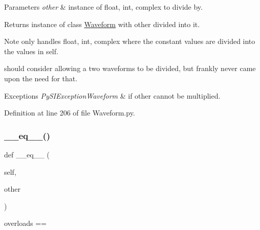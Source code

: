 \begin{DoxyParams}{Parameters}
{\em other} & instance of float, int, complex to divide by. \\
\hline
\end{DoxyParams}
\begin{DoxyReturn}{Returns}
instance of class \hyperlink{classSignalIntegrity_1_1TimeDomain_1_1Waveform_1_1Waveform_1_1Waveform}{Waveform} with other divided into it. 
\end{DoxyReturn}
\begin{DoxyNote}{Note}
only handles float, int, complex where the constant values are divided into the values in self. 

should consider allowing a two waveforms to be divided, but frankly never came upon the need for that. 
\end{DoxyNote}

\begin{DoxyExceptions}{Exceptions}
{\em Py\+S\+I\+Exception\+Waveform} & if other cannot be multiplied. \\
\hline
\end{DoxyExceptions}


Definition at line 206 of file Waveform.\+py.

\mbox{\label{classSignalIntegrity_1_1TimeDomain_1_1Waveform_1_1Waveform_1_1Waveform_ad794ff077f2f05f228a7109f3670ac40}} 
\subsubsection{\texorpdfstring{\+\_\+\+\_\+eq\+\_\+\+\_\+()}{\_\_eq\_\_()}}
{\footnotesize\ttfamily def \+\_\+\+\_\+eq\+\_\+\+\_\+ (\begin{DoxyParamCaption}\item[{}]{self,  }\item[{}]{other }\end{DoxyParamCaption})}



overloads == 


